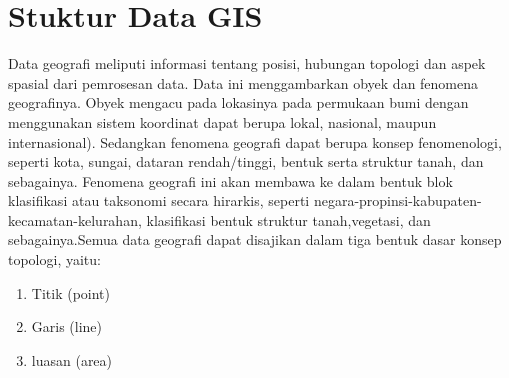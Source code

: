 \section{Stuktur Data GIS}
Data geografi meliputi informasi tentang posisi, hubungan topologi dan aspek spasial dari pemrosesan data. Data ini menggambarkan obyek dan fenomena geografinya. Obyek mengacu pada lokasinya pada permukaan bumi dengan menggunakan sistem koordinat dapat berupa lokal, nasional, maupun internasional). Sedangkan fenomena geografi dapat berupa konsep fenomenologi, seperti kota, sungai, dataran rendah/tinggi, bentuk serta struktur tanah, dan sebagainya. Fenomena geografi ini akan membawa ke dalam bentuk blok klasifikasi atau taksonomi secara hirarkis, seperti negara-propinsi-kabupaten-kecamatan-kelurahan, klasifikasi bentuk struktur tanah,vegetasi, dan sebagainya.Semua data geografi dapat disajikan dalam tiga bentuk dasar konsep topologi, yaitu:
\begin{enumerate}
\item Titik (point)
\item Garis (line)
\item luasan (area)
\end{enumerate}

